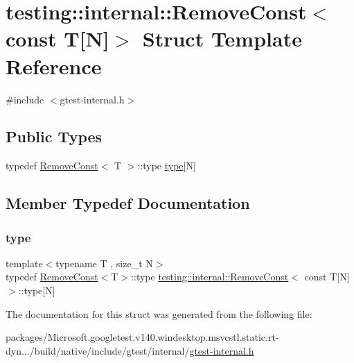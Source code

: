 \hypertarget{structtesting_1_1internal_1_1_remove_const_3_01const_01_t[_n]_4}{}\section{testing\+::internal\+::Remove\+Const$<$ const T\mbox{[}N\mbox{]}$>$ Struct Template Reference}
\label{structtesting_1_1internal_1_1_remove_const_3_01const_01_t[_n]_4}


{\ttfamily \#include $<$gtest-\/internal.\+h$>$}

\subsection*{Public Types}
\begin{DoxyCompactItemize}
\item 
typedef \mbox{\hyperlink{structtesting_1_1internal_1_1_remove_const}{Remove\+Const}}$<$ T $>$\+::type \mbox{\hyperlink{structtesting_1_1internal_1_1_remove_const_3_01const_01_t[_n]_4_ac976b53cb5d031a120fafbe790650068}{type}}\mbox{[}N\mbox{]}
\end{DoxyCompactItemize}


\subsection{Member Typedef Documentation}
\mbox{\label{structtesting_1_1internal_1_1_remove_const_3_01const_01_t[_n]_4_ac976b53cb5d031a120fafbe790650068}} 
\subsubsection{\texorpdfstring{type}{type}}
{\footnotesize\ttfamily template$<$typename T , size\+\_\+t N$>$ \\
typedef \mbox{\hyperlink{structtesting_1_1internal_1_1_remove_const}{Remove\+Const}}$<$T$>$\+::type \mbox{\hyperlink{structtesting_1_1internal_1_1_remove_const}{testing\+::internal\+::\+Remove\+Const}}$<$ const T\mbox{[}N\mbox{]}$>$\+::type\mbox{[}N\mbox{]}}



The documentation for this struct was generated from the following file\+:\begin{DoxyCompactItemize}
\item 
packages/\+Microsoft.\+googletest.\+v140.\+windesktop.\+msvcstl.\+static.\+rt-\/dyn.../build/native/include/gtest/internal/\mbox{\hyperlink{gtest-internal_8h}{gtest-\/internal.\+h}}\end{DoxyCompactItemize}
